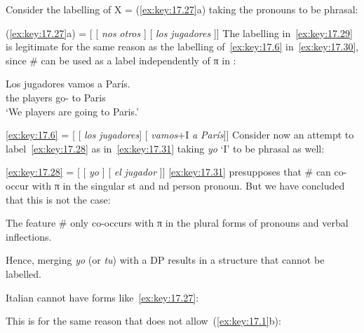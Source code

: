 \documentclass[output=paper]{langsci/langscibook}
\begin{document}
\label{ex:key:17.28}
\z
Consider the labelling of X = (\ref{ex:key:17.27}a) taking the pronouns to be
phrasal:

\ea\label{ex:key:17.29}
    (\ref{ex:key:17.27}a) = [ [ \emph{nos}\tss{\#} \emph{otros} ] [ \emph{los}\tss{\#} \emph{jugadores} ]]
\z
The labelling in~\eqref{ex:key:17.29} is legitimate for the same reason as the
labelling of~\eqref{ex:key:17.6} in~\eqref{ex:key:17.30}, since \# can be used as a
label independently of π in :

\begin{exe}
\exi{\eqref{ex:key:17.6}}
    \gll    Los jugadores vamos a París.\\
            the players      go-\Fpl{} to Paris\\
    \glt    ‘We players are going to Paris.’
\end{exe}

\ea\label{ex:key:17.30}
    \eqref{ex:key:17.6} = [ [ \emph{los}\tss{\#} \emph{jugadores}] [ \emph{vamos}+I\tss{\#}  \emph{a París}]]
\z
Consider now an attempt to label~\eqref{ex:key:17.28} as in~\eqref{ex:key:17.31} taking
\emph{yo} ‘I’ to be phrasal as well:

\ea\label{ex:key:17.31}
    \eqref{ex:key:17.28} = [ [ \emph{yo} ] [ \emph{el}\tss{\#} \emph{jugador} ]]
\z
\eqref{ex:key:17.31} presupposes that \# can co-occur with π in the singular
\First{}st and \Second{}nd person pronoun. But we have concluded that this is
not the case:

\begin{exe}
\exi{\eqref{ex:key:17.21}}
    The feature \# only co-occurs with π in the plural forms of pronouns
    and verbal inflections.
\end{exe}
Hence, merging \emph{yo} (or \emph{tu}) with a DP results in a structure that
cannot be labelled.

Italian cannot have forms like~\eqref{ex:key:17.27}:

\ea\label{ex:key:17.32}
    \z
\z
This is for the same reason that  does not allow~(\ref{ex:key:17.1}b):
\end{document}
